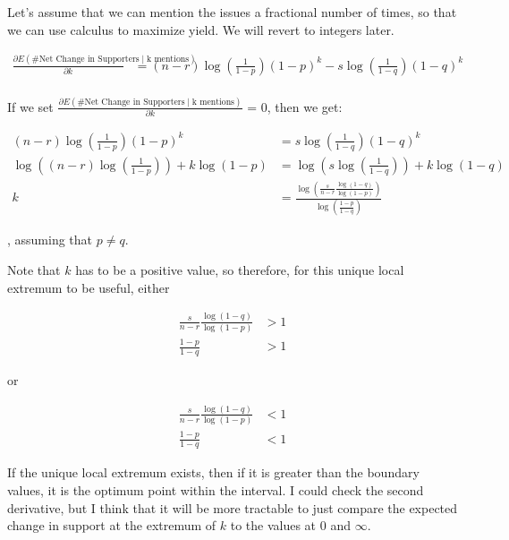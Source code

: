 \documentclass{article}
\begin{document}
Let's assume that we can mention the issues a fractional number of times,	
	so that we can use calculus to maximize yield.
We will revert to integers later.

\begin{align*}
\frac{\partial 
	E\left( \text{\# Net Change in Supporters} \mid \text{k mentions} \right)}
{\partial k}
	& =  (n - r) \log \left( \frac1{1-p} \right) (1 - p)^k
	- s \log \left( \frac1{1-q} \right) (1 - q)^k \\
\end{align*}

If we set 
$\frac{\partial 
	E\left( \text{\# Net Change in Supporters} \mid \text{k mentions} \right)}
{\partial k}$ = 0, then we get:

\begin{align*}
	(n - r) \log \left( \frac1{1-p} \right) (1 - p)^k
	& =  s \log \left( \frac1{1-q} \right) (1 - q)^k \\
	\log \left( (n - r) \log \left( \frac1{1-p} \right) \right)
	+ k \log \left( 1 - p \right)
	& =  
	\log \left( s \log \left( \frac1{1-q} \right) \right)
	+ k \log \left( 1 - q \right)\\
	k & = \frac{ \log \left(
		\frac s{n-r}
		\frac{ \log \left( 1 - q \right) }
			{ \log \left( 1 - p \right) } \right) } 
	{ \log \left( \frac{1 - p}{1 - q} \right)}
\end{align*}

, assuming that $p \neq q$.

Note that $k$ has to be a positive value, so therefore,
	for this unique local extremum to be useful,
	either

\begin{align*}
\frac s{n-r} \frac{ \log (1 - q)}{\log (1 - p)} & > 1\\
\frac{1 - p}{1 - q} & > 1
\end{align*}

or 

\begin{align*}
\frac s{n-r} \frac{ \log (1 - q)}{\log (1 - p)} & < 1\\
\frac{1 - p}{1 - q} & < 1
\end{align*}

If the unique local extremum exists, then if it is greater than
	the boundary values, it is the optimum point within the interval.
I could check the second derivative, but I think that it will 
	be more tractable to just compare the expected change in support at the 
	extremum of $k$ to the values at $0$ and $\infty$.
\end{document}
